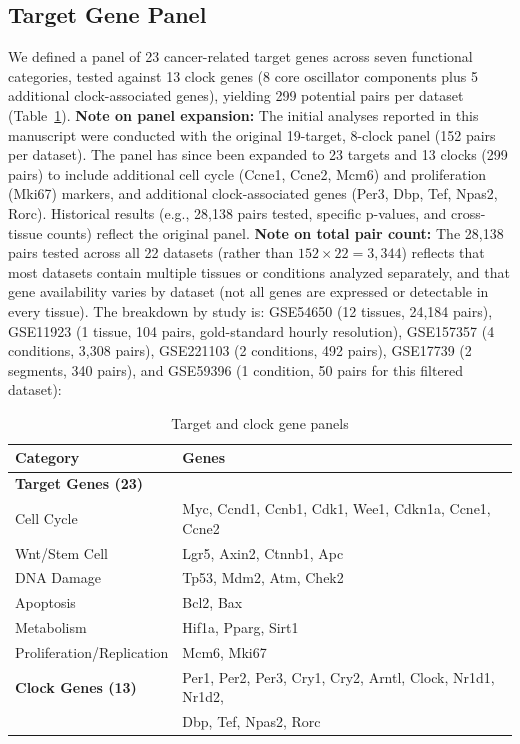 \documentclass[11pt,a4paper]{article}
\begin{document}
\subsection{Target Gene Panel}

We defined a panel of 23 cancer-related target genes across seven functional categories, tested against 13 clock genes (8 core oscillator components plus 5 additional clock-associated genes), yielding 299 potential pairs per dataset (Table~\ref{tab:genes}). \textbf{Note on panel expansion:} The initial analyses reported in this manuscript were conducted with the original 19-target, 8-clock panel (152 pairs per dataset). The panel has since been expanded to 23 targets and 13 clocks (299 pairs) to include additional cell cycle (Ccne1, Ccne2, Mcm6) and proliferation (Mki67) markers, and additional clock-associated genes (Per3, Dbp, Tef, Npas2, Rorc). Historical results (e.g., 28,138 pairs tested, specific p-values, and cross-tissue counts) reflect the original panel. \textbf{Note on total pair count:} The 28,138 pairs tested across all 22 datasets (rather than $152 \times 22 = 3,344$) reflects that most datasets contain multiple tissues or conditions analyzed separately, and that gene availability varies by dataset (not all genes are expressed or detectable in every tissue). The breakdown by study is: GSE54650 (12 tissues, 24,184 pairs), GSE11923 (1 tissue, 104 pairs, gold-standard hourly resolution), GSE157357 (4 conditions, 3,308 pairs), GSE221103 (2 conditions, 492 pairs), GSE17739 (2 segments, 340 pairs), and GSE59396 (1 condition, 50 pairs for this filtered dataset):

\begin{table}[H]
\centering
\caption{Target and clock gene panels}
\label{tab:genes}
\begin{tabular}{ll}
\toprule
Category & Genes \\
\midrule
\textbf{Target Genes (23)} & \\
Cell Cycle & Myc, Ccnd1, Ccnb1, Cdk1, Wee1, Cdkn1a, Ccne1, Ccne2 \\
Wnt/Stem Cell & Lgr5, Axin2, Ctnnb1, Apc \\
DNA Damage & Tp53, Mdm2, Atm, Chek2 \\
Apoptosis & Bcl2, Bax \\
Metabolism & Hif1a, Pparg, Sirt1 \\
Proliferation/Replication & Mcm6, Mki67 \\
\midrule
\textbf{Clock Genes (13)} & Per1, Per2, Per3, Cry1, Cry2, Arntl, Clock, Nr1d1, Nr1d2, \\
 & Dbp, Tef, Npas2, Rorc \\
\bottomrule
\end{tabular}
\end{table}
\end{document}
